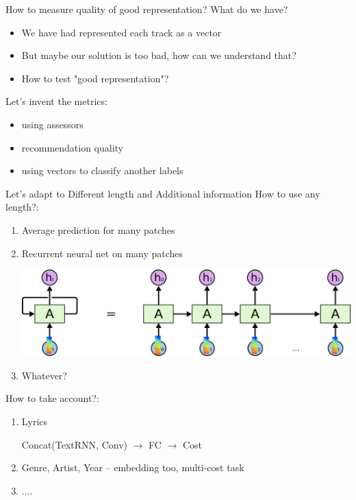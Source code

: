\documentclass{beamer}
\begin{document}
\begin{frame}{How to measure quality of good representation?} 
	What do we have?
	\begin{itemize}
		\item We have had represented each track as a vector
		\item But maybe our solution is too bad, how can we understand that?
		\item How to test "good representation"?
	\end{itemize}
	
	Let's invent the metrics:
		\begin{itemize}
			\item using assessors
			\item recommendation quality 
			\item using vectors to classify another labels
		\end{itemize}
\end{frame}

\begin{frame}{Let's adapt to Different length and Additional information} 
	How to use any length?:
		\begin{enumerate}
			\item Average prediction for many patches 		
			\item Recurrent neural net on many patches
				\begin{center}				
					\includegraphics[scale=0.25]{img/rnn}
				\end{center} 
			\item Whatever?
		\end{enumerate}
	How to take account?:
		\begin{enumerate}
			\item Lyrics
				\begin{center}
					Concat(TextRNN, Conv) $\rightarrow$ FC $\rightarrow$ Cost
				\end{center}
			\item Genre, Artist, Year -- embedding too, multi-cost task
			\item ....
		\end{enumerate}
\end{frame}
\end{document}
